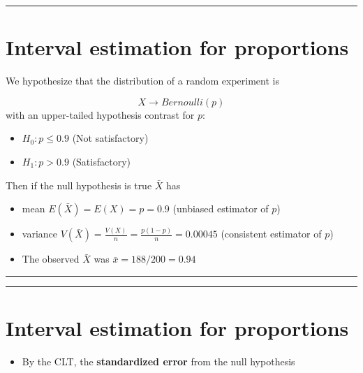 \documentclass[
]{book}
\providecommand{\tightlist}{%
  \setlength{\itemsep}{0pt}\setlength{\parskip}{0pt}}
\begin{document}
\begin{center}\rule{0.5\linewidth}{0.5pt}\end{center}

\hypertarget{interval-estimation-for-proportions-4}{%
\section{Interval estimation for proportions}\label{interval-estimation-for-proportions-4}}

We hypothesize that the distribution of a random experiment is

\[X \rightarrow Bernoulli (p)\]
with an upper-tailed hypothesis contrast for \(p\):

\begin{itemize}
\tightlist
\item
  \(H_0: p \leq 0.9\) (Not satisfactory)
\item
  \(H_1: p> 0.9\) (Satisfactory)
\end{itemize}

Then if the null hypothesis is true \(\bar{X}\) has

\begin{itemize}
\item
  mean \(E(\bar{X})=E(X)=p=0.9\) (unbiased estimator of \(p\))\\
\item
  variance \(V(\bar{X})=\frac{V(X)}{n}=\frac{p(1-p)}{n}=0.00045\) (consistent estimator of \(p\))
\item
  The observed \(\bar{X}\) was \(\bar{x}=188/200=0.94\)
\end{itemize}

\begin{center}\rule{0.5\linewidth}{0.5pt}\end{center}

\begin{center}\rule{0.5\linewidth}{0.5pt}\end{center}

\hypertarget{interval-estimation-for-proportions-5}{%
\section{Interval estimation for proportions}\label{interval-estimation-for-proportions-5}}

\begin{itemize}
\tightlist
\item
  By the CLT, the \textbf{standardized error} from the null hypothesis
\end{itemize}
\end{document}
